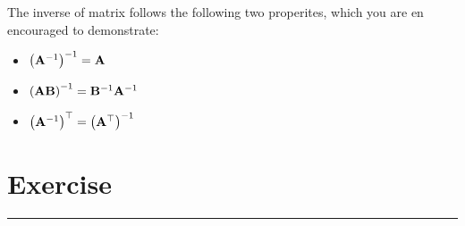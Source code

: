 The inverse of matrix follows the following two properites, which you are en encouraged to demonstrate:
\begin{itemize}
    \item $\left( \mathbf{A}^{-1}\right)^{-1} = \mathbf{A}$
    \item $\left( \mathbf{A}\mathbf{B}\right)^{-1} = \mathbf{B}^{-1}\mathbf{A}^{-1}$
    \item $\left( \mathbf{A}^{-1}\right)^{\top} = \left( \mathbf{A}^{\top}\right)^{-1}$
\end{itemize}

\section{Exercise}
\vspace{-0.5cm}
\begin{center}
    \rule{\textwidth}{1pt}
\end{center}

